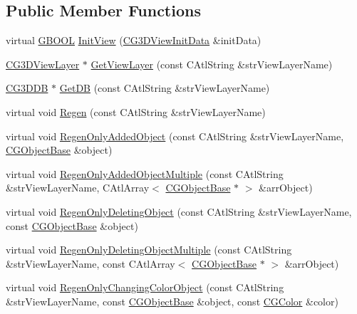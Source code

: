 \subsection*{Public Member Functions}
\begin{DoxyCompactItemize}
\item 
virtual \hyperlink{_g_types_8h_a2901915743626352a6820c5405f556dc}{G\+B\+O\+O\+L} \hyperlink{class_c_g3_d_view_aa4c947bd440cf3824372b88424a919c9}{Init\+View} (\hyperlink{class_c_g3_d_view_init_data}{C\+G3\+D\+View\+Init\+Data} \&init\+Data)
\item 
\hyperlink{class_c_g3_d_view_layer}{C\+G3\+D\+View\+Layer} $\ast$ \hyperlink{class_c_g3_d_view_a0dfb17c6279f6b76a614ce43a346595e}{Get\+View\+Layer} (const C\+Atl\+String \&str\+View\+Layer\+Name)
\item 
\hyperlink{class_c_g3_d_d_b}{C\+G3\+D\+D\+B} $\ast$ \hyperlink{class_c_g3_d_view_aed94adad7846ae7d5b4aaab4d6353fbb}{Get\+D\+B} (const C\+Atl\+String \&str\+View\+Layer\+Name)
\item 
virtual void \hyperlink{class_c_g3_d_view_aefc8cd44b4d375ac3b03c388b64c6f78}{Regen} (const C\+Atl\+String \&str\+View\+Layer\+Name)
\item 
virtual void \hyperlink{class_c_g3_d_view_a05d588d0192488323bcfcbf219cae359}{Regen\+Only\+Added\+Object} (const C\+Atl\+String \&str\+View\+Layer\+Name, \hyperlink{class_c_g_object_base}{C\+G\+Object\+Base} \&object)
\item 
virtual void \hyperlink{class_c_g3_d_view_af527f481d9dedb0d3b4dd7141c32f544}{Regen\+Only\+Added\+Object\+Multiple} (const C\+Atl\+String \&str\+View\+Layer\+Name, C\+Atl\+Array$<$ \hyperlink{class_c_g_object_base}{C\+G\+Object\+Base} $\ast$ $>$ \&arr\+Object)
\item 
virtual void \hyperlink{class_c_g3_d_view_ac548b357ba302865e820d8fee3d3ea23}{Regen\+Only\+Deleting\+Object} (const C\+Atl\+String \&str\+View\+Layer\+Name, const \hyperlink{class_c_g_object_base}{C\+G\+Object\+Base} \&object)
\item 
virtual void \hyperlink{class_c_g3_d_view_a2420bc1d545fbe7fedf47e855dcfb6a5}{Regen\+Only\+Deleting\+Object\+Multiple} (const C\+Atl\+String \&str\+View\+Layer\+Name, const C\+Atl\+Array$<$ \hyperlink{class_c_g_object_base}{C\+G\+Object\+Base} $\ast$ $>$ \&arr\+Object)
\item 
virtual void \hyperlink{class_c_g3_d_view_a8a6694a9de54a15cd4e94cb2fe1ba772}{Regen\+Only\+Changing\+Color\+Object} (const C\+Atl\+String \&str\+View\+Layer\+Name, const \hyperlink{class_c_g_object_base}{C\+G\+Object\+Base} \&object, const \hyperlink{class_c_g_color}{C\+G\+Color} \&color)

\end{DoxyCompactItemize}
